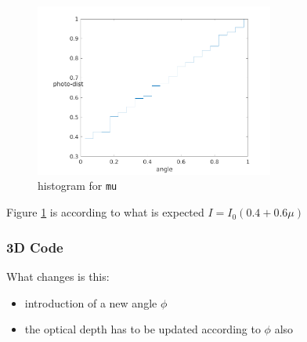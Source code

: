 \documentclass[../main/main.tex]{subfiles}
\begin{document}
\begin{figure}[!htp]
\centering
\includegraphics[width=0.7\textwidth]{../../introductory_exercises/limb_darkening/number_channels20number_photons100000max_opt_depth10.png}
\caption{histogram for \texttt{mu}}
\label{2D_mu}
\end{figure}
Figure \ref{2D_mu} is according to what is expected $I = I_0(0.4+0.6\mu)$

\newpage
\subsubsection{3D Code}
What changes is this: 
\begin{itemize}
\item introduction of a new angle $\phi$
\item the optical depth has to be updated according to $\phi$ also
\end{itemize}
\end{document}
